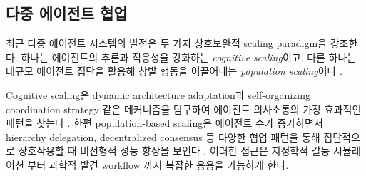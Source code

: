 
\subsection{다중 에이전트 협업}


최근 다중 에이전트 시스템의 발전은 두 가지 상호보완적 scaling paradigm을 강조한다. 하나는 에이전트의 추론과 적응성을 강화하는 \textit{cognitive scaling}이고, 다른 하나는 대규모 에이전트 집단을 활용해 창발 행동을 이끌어내는 \textit{population scaling}이다 \citep{zhugegptswarm, qian2024scalinglargelanguagemodelbasedmultiagentcollaboration}.

Cognitive scaling은 dynamic architecture adaptation과 self-organizing coordination strategy 같은 메커니즘을 탐구하여 에이전트 의사소통의 가장 효과적인 패턴을 찾는다 \citep{zhugegptswarm}. 한편 population-based scaling은 에이전트 수가 증가하면서 hierarchy delegation, decentralized consensus 등 다양한 협업 패턴을 통해 집단적으로 상호작용할 때 비선형적 성능 향상을 보인다 \citep{qian2024scalinglargelanguagemodelbasedmultiagentcollaboration}.
이러한 접근은 지정학적 갈등 시뮬레이션 \citep{hua2024warpeacewaragentlarge}부터 과학적 발견 workflow \citep{zhou2024hypothesis, zhang2025crewfacilitatinghumanaiteaming}까지 복잡한 응용을 가능하게 한다.

